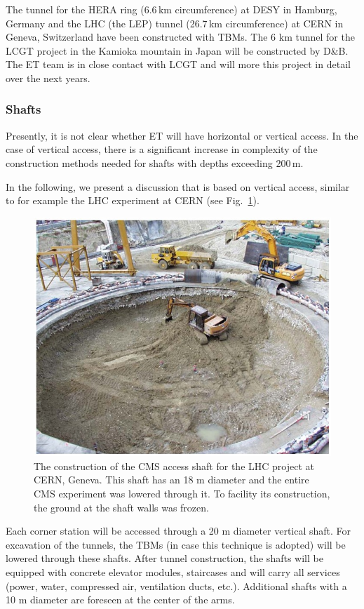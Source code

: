 The tunnel for the HERA ring (6.6\,km circumference) at DESY in Hamburg, Germany
and the LHC (the LEP) tunnel (26.7\,km circumference) at CERN in Geneva, Switzerland
have been constructed with TBMs. The 6 km tunnel for the LCGT project in the
Kamioka mountain in Japan will be constructed by D\&B. The ET team is in close
contact with LCGT and will more this project in detail over the next years.

\subsubsection{Shafts}

Presently, it is not clear whether ET will have horizontal or vertical access.
In the case of vertical access, there is a significant increase in complexity of the
construction methods needed for shafts with depths exceeding 200\,m. 

In the following, we present a discussion that is based on vertical access, similar
to for example the LHC experiment at CERN (see Fig.~\ref{fig:shaft}).

\begin{figure}[htbp!]
\centering
\includegraphics[width=12cm]{./Sec_SiteInfra/Figures/shaft.jpg}
\caption{The construction of the CMS access shaft for the LHC project at CERN, Geneva.
This shaft has an 18 m diameter and the entire CMS experiment was lowered through
it. To facility its construction, the ground at the shaft walls was frozen.}
\label{fig:shaft}
\end{figure}
Each corner station will be accessed through a 20 m diameter vertical shaft.
For excavation of the tunnels, the TBMs (in case this technique is adopted)
will be lowered through these shafts. After tunnel construction, the shafts
will be equipped with concrete elevator modules, staircases and will carry all
services (power, water, compressed air, ventilation ducts, etc.). Additional
shafts with a 10 m diameter are foreseen at the center of the arms.

